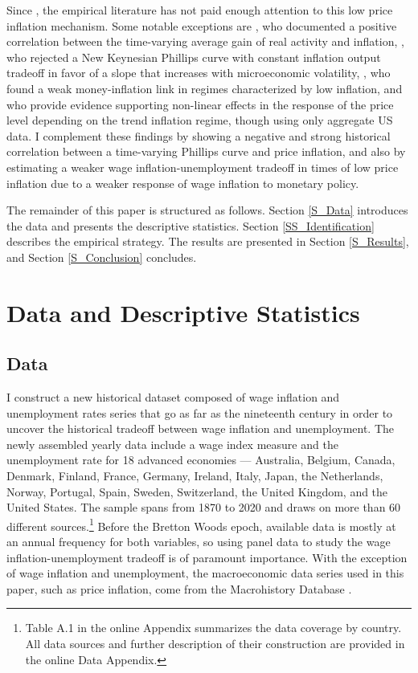\documentclass[12pt]{article}
\begin{document}
Since \cite{Ball1988}, the empirical literature has not paid enough attention to this low price inflation mechanism. Some notable exceptions are \cite{Benati2007}, who documented a positive correlation between the time-varying average gain of real activity and inflation, \cite{Vavra2014B}, who rejected a New Keynesian Phillips curve with constant inflation output tradeoff in favor of a slope that increases with microeconomic volatility, \cite{Gertler2018}, who found a weak money-inflation link in regimes characterized by low inflation, and \cite{Ascari2021, Ascari2022} who provide evidence supporting non-linear effects in the response of the price level depending on the trend inflation regime, though using only aggregate US data. I complement these findings by showing a negative and strong historical correlation between a time-varying Phillips curve and price inflation, and also by estimating a weaker wage inflation-unemployment tradeoff in times of low price inflation due to a weaker response of wage inflation to monetary policy.

The remainder of this paper is structured as follows. Section \ref{S_Data} introduces the data and presents the descriptive statistics. Section \ref{SS_Identification} describes the empirical strategy. The results are presented in Section \ref{S_Results}, and Section \ref{S_Conclusion} concludes.


\section{Data and Descriptive Statistics \label{S_Data}}
\subsection{Data}

I construct a new historical dataset composed of wage inflation and unemployment rates series that go as far as the nineteenth century in order to uncover the historical tradeoff between wage inflation and unemployment. The newly assembled yearly data include a wage index measure and the unemployment rate for 18 advanced economies — Australia, Belgium, Canada, Denmark, Finland, France, Germany, Ireland, Italy, Japan, the Netherlands, Norway, Portugal, Spain, Sweden, Switzerland, the United Kingdom, and the United States. The sample spans from 1870 to 2020 and draws on more than 60 different sources.\footnote{Table A.1 in the online Appendix summarizes the data coverage by country. All data sources and further description of their construction are provided in the online Data Appendix.} Before the Bretton Woods epoch, available data is mostly at an annual frequency for both variables, so using panel data to study the wage inflation-unemployment tradeoff is of paramount importance. With the exception of wage inflation and unemployment, the macroeconomic data series used in this paper, such as price inflation, come from the Macrohistory Database \citep{Jorda2017}.
\end{document}
